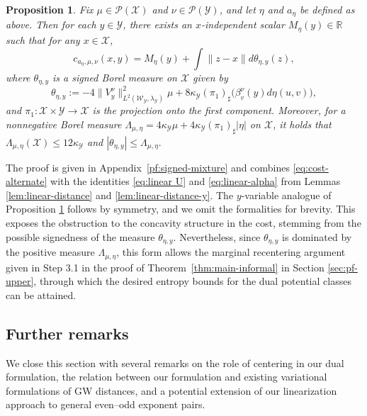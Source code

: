 \documentclass[11pt]{amsart}
\newtheorem{proposition}[theorem]{Proposition}
\theoremstyle{definition}
\theoremstyle{remark}
\newcommand{\R}{\mathbb{R}}
\newcommand{\cP}{\mathcal{P}}
\newcommand{\1}{\mathbf{1}}
\numberwithin{equation}{section}
\begin{document}
\begin{proposition}\label{lem:signed-mixture}
Fix $\mu\in\cP(\mathcal X)$ and $\nu\in\cP(\mathcal Y)$, and let $\eta$ and $a_\eta$ be defined as above. Then for each $y\in \mathcal Y$, there exists an $x$-independent scalar $M_\eta(y) \in \R$ such that for any $x\in \mathcal{X}$,
\begin{equation}\label{eq:signed-mixture}
c_{a_\eta,\mu,\nu}(x,y)=M_\eta(y)+\int \|z-x\|d\theta_{\eta,y}(z),
\end{equation}
where $\theta_{\eta,y}$ is a signed Borel measure on $\mathcal{X}$ given by
\begin{equation}\label{eq:theta-def}
\theta_{\eta,y}:=-4\|V_y^\nu\|^2_{L^2(\mathcal{W}_\mathcal{Y},\lambda_\mathcal{Y})}\mu
+8\kappa_{\mathcal Y}(\pi_1)_\sharp\bigl(\beta_v^\nu(y)d\eta(u,v)\bigr),
\end{equation}
and $\pi_1:\mathcal X\times \mathcal Y\to \mathcal X$ is the projection onto the first component.  Moreover, for a nonnegative Borel measure $\Lambda_{\mu, \eta}=4\kappa_{\mathcal Y}\mu+4\kappa_{\mathcal Y}(\pi_1)_\sharp|\eta|$ on $\mathcal{X}$, it holds that $\Lambda_{\mu,\eta}(\mathcal X)\le 12\kappa_{\mathcal Y}$ and 
$|\theta_{\eta,y}|
\le \Lambda_{\mu,\eta}.$
\end{proposition}

The proof is given in Appendix~\ref{pf:signed-mixture} and combines \eqref{eq:cost-alternate} with the identities \eqref{eq:linear U} and \eqref{eq:linear-alpha} from Lemmas \ref{lem:linear-distance} and \ref{lem:linear-distance-y}. The $y$-variable analogue of Proposition \ref{lem:signed-mixture} follows by symmetry, and we omit the
formalities for brevity.
This exposes the obstruction to the concavity structure in the cost,
stemming from the possible signedness of the measure $\theta_{\eta,y}$. Nevertheless,
since $\theta_{\eta,y}$ is dominated by the positive measure $\Lambda_{\mu,\eta}$,
this form allows the marginal recentering argument given in Step 3.1 in the proof of
Theorem~\ref{thm:main-informal} in Section \ref{sec:pf-upper}, through which the desired entropy bounds for
the dual potential classes can be attained.
\subsection{Further remarks}
We close this section with several remarks on the role of centering in our dual formulation, the relation between our formulation and existing variational formulations of GW distances, and a potential extension of our linearization approach to general even--odd exponent pairs.
\end{document}
